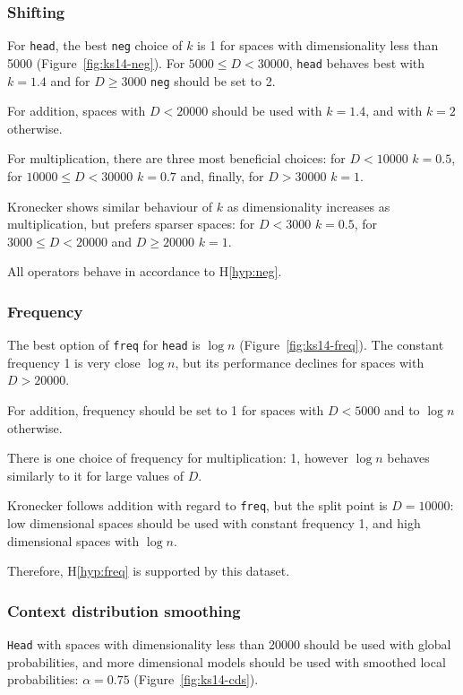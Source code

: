 \subsubsection{Shifting}


For \texttt{head}, the best \texttt{neg} choice of $k$ is 1 for spaces with dimensionality less than 5000 (Figure~\ref{fig:ks14-neg}). For $5000 \leq D < 30000$, \texttt{head} behaves best with $k = 1.4$ and for $D \geq 3000$ \texttt{neg} should be set to 2.

For addition, spaces with $D < 20000$ should be used with $k = 1.4$, and with $k = 2$ otherwise.

For multiplication, there are three most beneficial choices: for $D < 10000$ $k = 0.5$, for $10000 \leq D < 30000$ $k = 0.7$ and, finally, for $D > 30000$ $k = 1$.

Kronecker shows similar behaviour of $k$ as dimensionality increases as multiplication, but prefers sparser spaces: for $D < 3000$ $k = 0.5$, for $3000 \leq D < 20000$ and $D \geq 20000$ $k = 1$.

All operators behave in accordance to H\ref{hyp:neg}.

\subsubsection{Frequency}
The best option of \texttt{freq} for \texttt{head} is $\log n$ (Figure~\ref{fig:ks14-freq}). The constant frequency 1 is very close $\log n$, but its performance declines for spaces with $D > 20000$.

For addition, frequency should be set to 1 for spaces with $D < 5000$ and to $\log n$ otherwise.

There is one choice of frequency for multiplication: 1, however $\log n$ behaves similarly to it for large values of $D$.

Kronecker follows addition with regard to \texttt{freq}, but the split point is $D = 10000$: low dimensional spaces should be used with constant frequency 1, and high dimensional spaces with $\log n$.

Therefore, H\ref{hyp:freq} is supported by this dataset.

\subsubsection{Context distribution smoothing}


\texttt{Head} with spaces with dimensionality less than 20000 should be used with global probabilities, and more dimensional models should be used with smoothed local probabilities: $\alpha = 0.75$ (Figure~\ref{fig:ks14-cds}).


